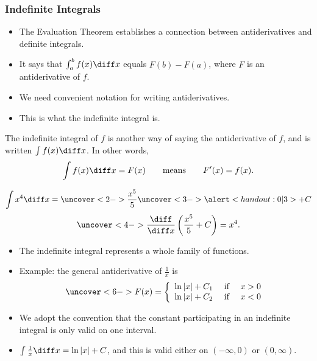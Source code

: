 \begin{frame}\frametitle{Indefinite Integrals}
\begin{itemize}
\item  The Evaluation Theorem establishes a connection between antiderivatives and definite integrals.
\item  It says that $\int_a^b f(x)\diff x$ equals $F(b) - F(a)$, where $F$ is an antiderivative of $f$.
\item  We need convenient notation for writing antiderivatives.
\item  This is what the indefinite integral is.
\end{itemize}
\begin{definition}
The indefinite integral of $f$ is another way of saying the antiderivative of $f$, and is written $\int f(x) \diff x$.  In other words,
\abovedisplayskip=0pt
\belowdisplayskip=0pt
\[
\int f(x) \diff x = F(x) \qquad \text{means}\qquad F'(x) = f(x).
\]
\end{definition}
\end{frame}

\begin{frame}
\begin{example}
\abovedisplayskip=0pt
\belowdisplayskip=0pt
\[
\int x^4 \diff x = \uncover<2->{\frac{x^5}{5}} \uncover<3->{\alert<handout:0| 3>{+ C}}
\]
\abovedisplayskip=0pt
\belowdisplayskip=0pt
\[
\uncover<4->{\frac{\diff}{\diff x}\left( \frac{x^5}{5} + C\right) = x^4.}
\]
\end{example}
\begin{itemize}
\item<5->  The indefinite integral represents a whole family of functions.
\item<6->  Example: %
the general antiderivative of $\frac{1}{x}$ is
\abovedisplayskip=0pt
\belowdisplayskip=0pt
\[
\uncover<6->{%
F(x) = \left\{ \begin{array}{ccc}
\ln |x| + C_1 & \text{ if } & x > 0\\
\ln |x| + C_2 & \text{ if } & x < 0
\end{array}\right.
}%
\]
\item<7->  We adopt the convention that the constant participating in an indefinite integral is only valid on one interval.
\item<8->  $\int \frac{1}{x} \diff x = \ln |x| + C$, and this is valid either on $(-\infty , 0)$ or $(0, \infty)$.
\end{itemize}
\end{frame}
